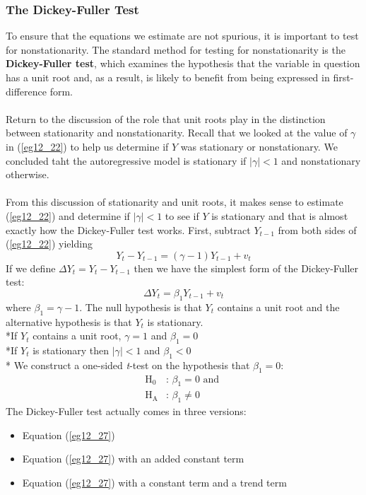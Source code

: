 \documentclass[11pt]{article}
\begin{document}
\subsubsection{The Dickey-Fuller Test}
To ensure that the equations we estimate are not spurious, it is important to test for nonstationarity. The standard method for testing for nonstationarity is the \textbf{Dickey-Fuller test}, which examines the hypothesis that the variable in question has a unit root and, as a result, is likely to benefit from being expressed in first-difference form.\\ \\
Return to the discussion of the role that unit roots play in the distinction between stationarity and nonstationarity. Recall that we looked at the value of $\gamma$ in (\ref{eg12_22}) to help us determine if $Y$ was stationary or nonstationary. We concluded taht the autoregressive model is stationary if $|\gamma|<1$ and nonstationary otherwise. \\ \\
From this discussion of stationarity and unit roots, it makes sense to estimate (\ref{eg12_22}) and determine if $|\gamma|<1$ to see if $Y$ is stationary and that is almost exactly how the Dickey-Fuller test works. First, subtract $Y_{t-1}$ from both sides of (\ref{eg12_22}) yielding
\begin{equation}
Y_t - Y_{t-1} = (\gamma -1)Y_{t-1} + v_t \label{eg12_26}
\end{equation}
If we define $\Delta Y_t = Y_t - Y_{t-1}$ then we have the simplest form of the Dickey-Fuller test:
\begin{equation}
\Delta Y_t =\beta_1Y_{t-1} + v_t \label{eg12_27}
\end{equation}
where $\beta_1 = \gamma - 1$. The null hypothesis is that $Y_t$ contains a unit root and the alternative hypothesis is that $Y_t$ is stationary. \\*If $Y_t$ contains a unit root, $\gamma = 1$ and $\beta_1=0$ \\*If $Y_t$ is stationary then $|\gamma|<1$ and $\beta_1<0$\\*
We construct a one-sided \textit{t}-test on the hypothesis that $\beta_1=0$:
\begin{align*}
 \text{H}_0 & \text{: }\beta_1 = 0 \text{ and }\\ \text{H}_\text{A} & \text{: } \beta_1 \neq 0
\end{align*}
The Dickey-Fuller test actually comes in three versions:
\begin{itemize}
\item Equation (\ref{eg12_27})
\item Equation (\ref{eg12_27}) with an added constant term
\item Equation (\ref{eg12_27}) with a constant term and a trend term
\end{itemize}
\end{document}
